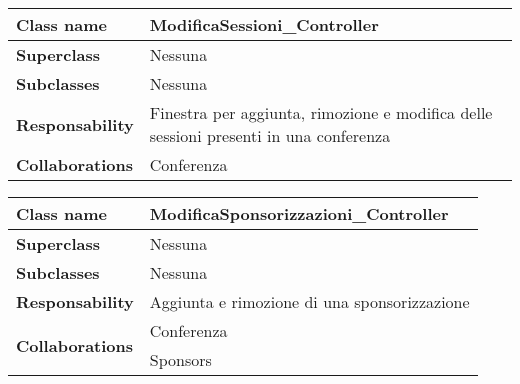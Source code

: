 \begin{table}[h!]
	\begin{tabular}{|l|l|}
		\hline 
		\textbf{Class name} & ModificaSessioni\_Controller
		\\ \hline
		\textbf{Superclass} & Nessuna
		\\ \hline
		\multirow{1}{*}{\textbf{Subclasses}} & Nessuna
		\\ \hline
		\textbf{Responsability} & Finestra per aggiunta, rimozione e modifica delle sessioni presenti in una conferenza
		\\ \hline
		\multirow{1}{*}{\textbf{Collaborations}} & Conferenza
		\\ \hline
	\end{tabular}
\end{table}
\begin{table}[h!]
	\begin{tabular}{|l|l|}
		\hline 
		\textbf{Class name} & ModificaSponsorizzazioni\_Controller
		\\ \hline
		\textbf{Superclass} & Nessuna
		\\ \hline
		\multirow{1}{*}{\textbf{Subclasses}} & Nessuna
		\\ \hline
		\textbf{Responsability} & Aggiunta e rimozione di una sponsorizzazione
		\\ \hline
		\multirow{2}{*}{\textbf{Collaborations}} & Conferenza \\
		& Sponsors		\\ \hline
	\end{tabular}
\end{table}

\newpage
